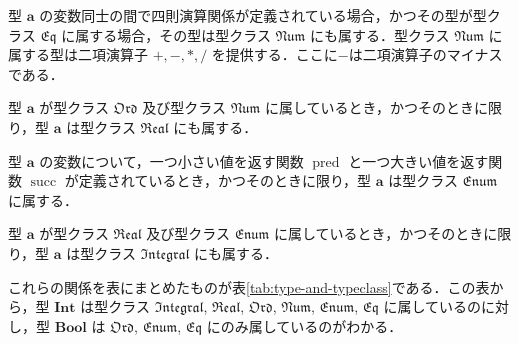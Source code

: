 \documentclass[a4paper,draft]{jsbook}
\newcommand{\mType}[1]{\mathbf{#1}}
\newcommand{\mBoolType}{\mType{Bool}}
\newcommand{\mIntType}{\mType{Int}}
\newcommand{\mSpecialTypeClass}[1]{\mathfrak{#1}} %
\newcommand{\mEqTypeClass}{\mSpecialTypeClass{Eq}}
\newcommand{\mOrdTypeClass}{\mSpecialTypeClass{Ord}}
\newcommand{\mNumTypeClass}{\mSpecialTypeClass{Num}}
\newcommand{\mRealTypeClass}{\mSpecialTypeClass{Real}}
\newcommand{\mEnumTypeClass}{\mSpecialTypeClass{Enum}}
\newcommand{\mIntegralTypeClass}{\mSpecialTypeClass{Integral}}
\DeclareMathOperator{\mPred}{pred}
\DeclareMathOperator{\mSucc}{succ}
\begin{document}
型 $\mType{a}$ の変数同士の間で四則演算関係が定義されている場合，かつその型が型クラス $\mEqTypeClass$ に属する場合，その型は型クラス $\mNumTypeClass$ にも属する．型クラス $\mNumTypeClass$ に属する型は二項演算子 $+,-,*,/$ を提供する．ここに$-$は二項演算子のマイナスである．

型 $\mType{a}$ が型クラス $\mOrdTypeClass$ 及び型クラス $\mNumTypeClass$ に属しているとき，かつそのときに限り，型 $\mType{a}$ は型クラス $\mRealTypeClass$ にも属する．

型 $\mType{a}$ の変数について，一つ小さい値を返す関数 $\mPred$ と一つ大きい値を返す関数 $\mSucc$ が定義されているとき，かつそのときに限り，型 $\mType{a}$ は型クラス $\mEnumTypeClass$ に属する．

型 $\mType{a}$ が型クラス $\mRealTypeClass$ 及び型クラス $\mEnumTypeClass$ に属しているとき，かつそのときに限り，型 $\mType{a}$ は型クラス $\mIntegralTypeClass$ にも属する．

これらの関係を表にまとめたものが表\ref{tab:type-and-typeclass}である．この表から，型 $\mIntType$ は型クラス $\mIntegralTypeClass$, $\mRealTypeClass$, $\mOrdTypeClass$, $\mNumTypeClass$, $\mEnumTypeClass$, $\mEqTypeClass$ に属しているのに対し，型 $\mBoolType$ は $\mOrdTypeClass$, $\mEnumTypeClass$, $\mEqTypeClass$ にのみ属しているのがわかる．
\end{document}
